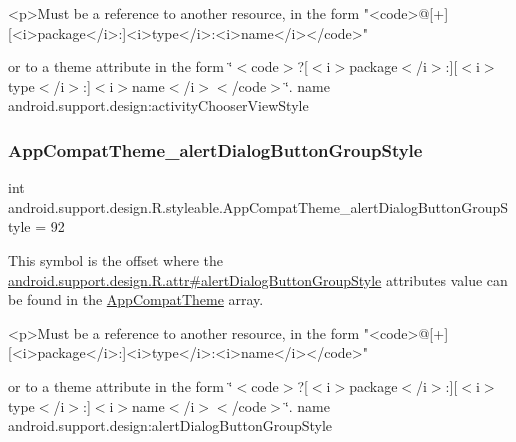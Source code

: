 \begin{DoxyVerb}      <p>Must be a reference to another resource, in the form "<code>@[+][<i>package</i>:]<i>type</i>:<i>name</i></code>"
\end{DoxyVerb}
 or to a theme attribute in the form \char`\"{}$<$code$>$?\mbox{[}$<$i$>$package$<$/i$>$\+:\mbox{]}\mbox{[}$<$i$>$type$<$/i$>$\+:\mbox{]}$<$i$>$name$<$/i$>$$<$/code$>$\char`\"{}.  name android.\+support.\+design\+:activity\+Chooser\+View\+Style \mbox{\label{classandroid_1_1support_1_1design_1_1R_1_1styleable_a677c1a9a3b75fec8ef5728a4e4d62af1}} 
\subsubsection{\texorpdfstring{App\+Compat\+Theme\+\_\+alert\+Dialog\+Button\+Group\+Style}{AppCompatTheme\_alertDialogButtonGroupStyle}}
{\footnotesize\ttfamily int android.\+support.\+design.\+R.\+styleable.\+App\+Compat\+Theme\+\_\+alert\+Dialog\+Button\+Group\+Style = 92\hspace{0.3cm}{\ttfamily [static]}}

This symbol is the offset where the \hyperlink{classandroid_1_1support_1_1design_1_1R_1_1attr_a9b0a2f5e8a1665173335cee8864fe659}{android.\+support.\+design.\+R.\+attr\#alert\+Dialog\+Button\+Group\+Style} attribute\textquotesingle{}s value can be found in the \hyperlink{classandroid_1_1support_1_1design_1_1R_1_1styleable_afb351dc8de20cbd4c89abe360373010c}{App\+Compat\+Theme} array.

\begin{DoxyVerb}      <p>Must be a reference to another resource, in the form "<code>@[+][<i>package</i>:]<i>type</i>:<i>name</i></code>"
\end{DoxyVerb}
 or to a theme attribute in the form \char`\"{}$<$code$>$?\mbox{[}$<$i$>$package$<$/i$>$\+:\mbox{]}\mbox{[}$<$i$>$type$<$/i$>$\+:\mbox{]}$<$i$>$name$<$/i$>$$<$/code$>$\char`\"{}.  name android.\+support.\+design\+:alert\+Dialog\+Button\+Group\+Style \mbox{\label{classandroid_1_1support_1_1design_1_1R_1_1styleable_a80b2dc95b64789c884807b4dcd06b6d0}} 
